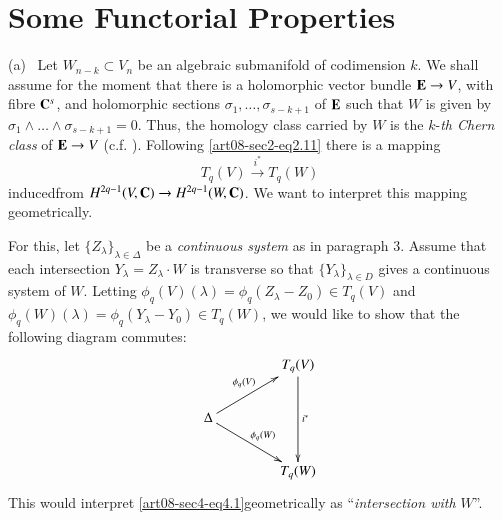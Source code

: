 \section{Some Functorial Properties}\label{art08-sec4}
(a)~ Let $W_{n-k}\subset V_{n}$ be an algebraic submanifold of codimension $k$. We shall assume for the moment that there is a holomorphic vector bundle $\mathbf{E}\to V$, with fibre $\mathbf{C}^{s}$, and holomorphic sections $\sigma_{1},\ldots,\sigma_{s-k+1}$ of $\mathbf{E}$ such that $W$ is given by $\sigma_{1}\wedge\ldots\wedge \sigma_{s-k+1}=0$. Thus, the homology class carried by $W$ is the $k$-{\em th Chern class} of $\mathbf{E}\to V$ (c.f. \cite{art08-key5}). Following \eqref{art08-sec2-eq2.11} there is a mapping
\setcounter{equation}{0}
\begin{equation}
T_{q}(V)\xrightarrow{i^{*}}T_{q}(W)\label{art08-sec4-eq4.1}
\end{equation}
induced\pageoriginale from $H^{2q-1}(V,\mathbf{C})\to H^{2q-1}(W,\mathbf{C})$. We want to interpret this mapping geometrically.

For this, let $\{Z_{\lambda}\}_{\lambda\in \Delta}$ be a {\em continuous system} as in paragraph 3. Assume that each intersection $Y_{\lambda}=Z_{\lambda}\cdot W$ is transverse so that $\{Y_{\lambda}\}_{\lambda\in D}$ gives a continuous system of $W$. Letting $\phi_{q}(V)(\lambda)=\phi_{q}(Z_{\lambda}-Z_{0})\in T_{q}(V)$ and $\phi_{q}(W)(\lambda)=\phi_{q}(Y_{\lambda}-Y_{0})\in T_{q}(W)$, we would like to show that the following diagram commutes:
\begin{equation}
\vcenter{\xymatrix@C=1.5cm{
 & T_{q}(V)\ar[dd]^{i^{*}}\\
\Delta\ar[ur]^{\phi_{q}(V)}\ar[dr]^{\phi_{q}(W)} & \\
 & T_{q}(W)
}}\label{art08-sec4-eq4.2}
\end{equation}
This would interpret \eqref{art08-sec4-eq4.1}geometrically as ``{\em intersection with $W$}''.


